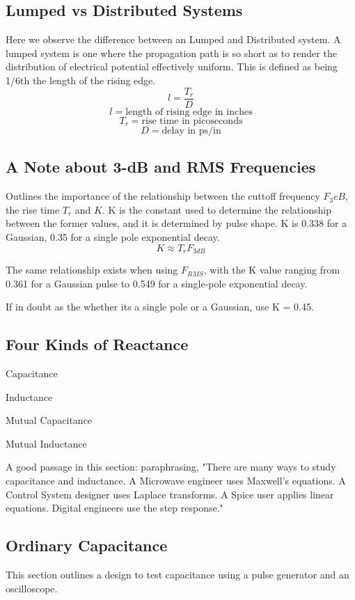 \documentclass{article}
\begin{document}
	\subsection{Lumped vs Distributed Systems}
	Here we observe the difference between an Lumped and Distributed system. A lumped system is one where the propagation path is so short as to render the distribution of electrical potential effectively uniform. This is defined as being 1/6th the length of the rising edge. 
	$$l = \frac{T_{r}}{D}$$
	$$l = \text{length of rising edge in inches}$$
	$$T_{r} = \text{rise time in picoseconds}$$
	$$D = \text{delay in ps/in}$$
	\subsection{A Note about 3-dB and RMS Frequencies}
	Outlines the importance of the relationship between the cuttoff frequency $F_3cB$, the rise time $T_{r}$ and $K$. K is the constant used to determine the relationship between the former values, and it is determined by pulse shape. K is 0.338 for a Gaussian, 0.35 for a single pole exponential decay. $$K \approx T_{r} F_{3dB}$$
	
	The same relationship exists when using $F_{RMS}$, with the K value ranging from 0.361 for a Gaussian pulse to 0.549 for a single-pole exponential decay.
	
	If in doubt as the whether its a single pole or a Gaussian, use K = 0.45.
	\subsection{Four Kinds of Reactance}
		\begin{description}
			\item Capacitance
			\item Inductance
			\item Mutual Capacitance
			\item Mutual Inductance
		\end{description}
	A good passage in this section: paraphrasing, "There are many ways to study capacitance and inductance. A Microwave engineer uses Maxwell's equations. A Control System designer uses Laplace transforms. A Spice user applies linear equations. Digital engineers use the step response."
	\subsection{Ordinary Capacitance}
	This section outlines a design to test capacitance using a pulse generator and an oscilloscope.
\end{document}
